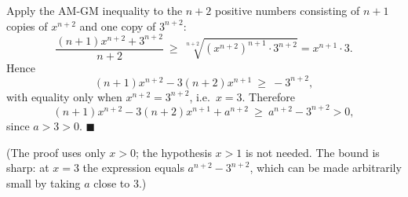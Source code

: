 Apply the AM-GM inequality to the $n+2$ positive numbers consisting of $n+1$ copies of $x^{n+2}$ and one copy of $3^{n+2}$:
\[
\dfrac{(n+1)x^{n+2}+3^{n+2}}{n+2}\ \ge\ \sqrt[n+2]{\left(x^{n+2}\right)^{n+1}\cdot3^{n+2}}=x^{n+1}\cdot3 .
\]
Hence
\[
(n+1)x^{n+2}-3(n+2)x^{n+1}\ \ge\ -3^{n+2},
\]
with equality only when $x^{n+2}=3^{n+2}$, i.e.\ $x=3$. Therefore
\[
(n+1)x^{n+2}-3(n+2)x^{n+1}+a^{n+2}\ \ge\ a^{n+2}-3^{n+2}>0,
\]
since $a>3>0$. $\blacksquare$

(The proof uses only $x>0$; the hypothesis $x>1$ is not needed. The bound is sharp: at $x=3$ the expression equals $a^{n+2}-3^{n+2}$, which can be made arbitrarily small by taking $a$ close to $3$.)
